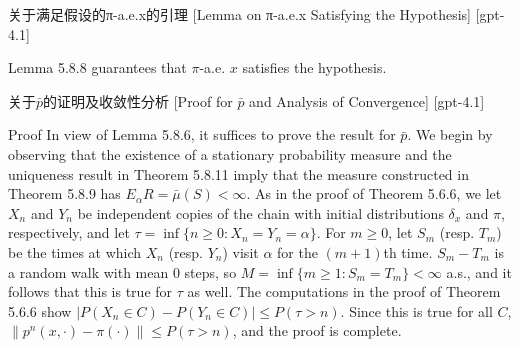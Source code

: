 \documentclass[UTF8]{ctexart}
\begin{document}
    
    
    \begin{lma}
        {关于满足假设的π-a.e.x的引理}
        [Lemma on π-a.e.x Satisfying the Hypothesis]
        [gpt-4.1]
        
Lemma 5.8.8 guarantees that $\pi$-a.e. $x$ satisfies the hypothesis.

    \end{lma}
    
    
    
    \begin{prf}
        {关于$\bar{p}$的证明及收敛性分析}
        [Proof for $\bar{p}$ and Analysis of Convergence]
        [gpt-4.1]
        
Proof In view of Lemma 5.8.6, it suffices to prove the result for $\bar{p}$. We begin by observing that the existence of a stationary probability measure and the uniqueness result in Theorem 5.8.11 imply that the measure constructed in Theorem 5.8.9 has $E_{\alpha}R = \bar{\mu}(S) < \infty$. As in the proof of Theorem 5.6.6, we let $X_n$ and $Y_n$ be independent copies of the chain with initial distributions $\delta_x$ and $\pi$, respectively, and let $\tau = \inf\{ n \geq 0 : X_n = Y_n = \alpha \}$. For $m \geq 0$, let $S_m$ (resp. $T_m$) be the times at which $X_n$ (resp. $Y_n$) visit $\alpha$ for the $(m+1)$th time. $S_m - T_m$ is a random walk with mean 0 steps, so $M = \inf\{ m \geq 1 : S_m = T_m \} < \infty$ a.s., and it follows that this is true for $\tau$ as well. The computations in the proof of Theorem 5.6.6 show $| P(X_n \in C) - P(Y_n \in C) | \leq P(\tau > n)$. Since this is true for all $C$, $\| p^n(x, \cdot) - \pi(\cdot) \| \leq P(\tau > n)$, and the proof is complete.

    \end{prf}
    
    
    
\end{document}
